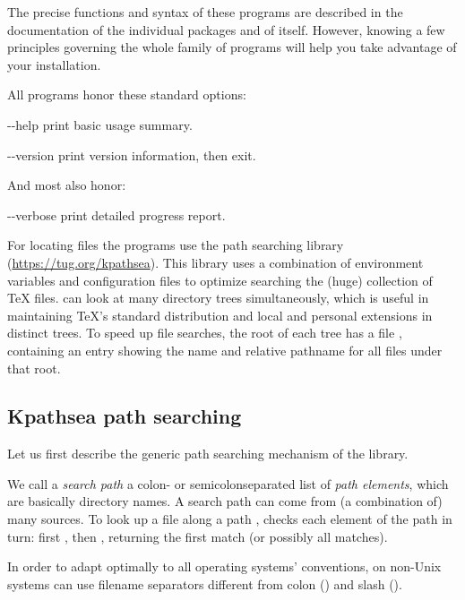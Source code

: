 \documentclass{article}
\begin{document}
\noindent The precise functions and syntax of these programs are
described in the documentation of the individual packages and of \Webc{}
itself.  However, knowing a few principles governing the whole family of
programs will help you take advantage of your \Webc{} installation.

All programs honor these standard \GNU options:
\begin{ttdescription}
\item[-{}-help] print basic usage summary.
\item[-{}-version] print version information, then exit.
\end{ttdescription}

And most also honor:
\begin{ttdescription}
\item[-{}-verbose] print detailed progress report.
\end{ttdescription}

For locating files the \Webc{} programs use the path searching library
\KPS{} (\url{https://tug.org/kpathsea}).  This library uses a combination
of environment variables and configuration files to optimize searching
the (huge) collection of \TeX{} files.  \Webc{} can look at many
directory trees simultaneously, which is useful in maintaining \TeX's
standard distribution and local and personal extensions in distinct
trees.  To speed up file searches, the root of each tree has a file
, containing an entry showing the name and relative pathname
for all files under that root.


\subsection{Kpathsea path searching}
\label{sec:kpathsea}

Let us first describe the generic path searching mechanism of the \KPS{}
library.

We call a \emph{search path} a colon- or semicolon\hyph sepa\-rated list
of \emph{path elements}, which are basically directory names.  A
search path can come from (a combination of) many sources.  To look up
a file  along a path , \KPS{} checks each
element of the path in turn: first , then
, returning the first match (or possibly all
matches).

In order to adapt optimally to all operating systems' conventions, on
non-Unix systems \KPS{} can use filename separators different from
colon (\samp{:}) and slash (\samp{/}).
\end{document}
